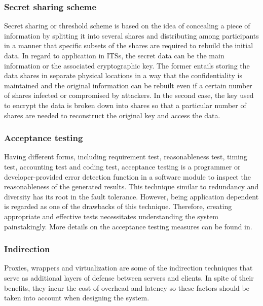 \documentclass[preprint,number,12pt]{elsarticle}
\begin{document}
\subsubsection{Secret sharing scheme}
Secret sharing or threshold scheme is based on the idea of concealing a piece of information by splitting it into several shares and distributing among participants in a manner that  specific subsets of the shares are required to rebuild the initial data\citep{AlEbri2011}. In regard to application in ITSs, the secret data can be the main information or the associated cryptographic key. The former entails storing the data shares in separate physical locations in a way that the confidentiality is maintained and the original information can be rebuilt even if a certain number of shares infected or compromised by attackers. In the second case, the key used to encrypt the data is broken down into shares so that a particular number of shares are needed to reconstruct the original key and access the data\citep{Wang2003b}.
\subsubsection{Acceptance testing}
Having different forms, including requirement test, reasonableness test, timing test, accounting test and coding test, acceptance testing is a programmer or developer-provided error detection function in a software module to inspect the reasonableness of the generated results. This technique similar to redundancy and diversity has its root in the fault tolerance. However, being application dependent is regarded as one of the drawbacks of this technique. Therefore, creating appropriate and effective tests necessitates understanding the system painstakingly. More details on the acceptance testing measures can be found in\citep{Wang20031399}.
\subsubsection{Indirection}
Proxies, wrappers and virtualization are some of the indirection techniques that serve as additional layers of defense between servers and clients. In spite of their benefits, they incur the cost of overhead and latency so these factors should be taken into account when designing the system\citep{Wang2003b}.
\end{document}
